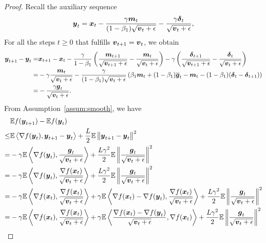 \begin{proof}
Recall the auxiliary sequence
\begin{align*}
    \boldsymbol{y}_t = \boldsymbol{x}_t - \frac{\gamma\boldsymbol{m}_t}{(1-\beta_1)\sqrt{\boldsymbol{v}_t+\epsilon}} - \frac{\gamma\boldsymbol{\delta}_{t}}{\sqrt{\boldsymbol{v}_t+\epsilon}},
\end{align*}
For all the steps $t\geq 0$ that fulfills $\boldsymbol{v}_{t+1}=\boldsymbol{v}_{t}$, we obtain
\begin{align*}
    \boldsymbol{y}_{t+1} - \boldsymbol{y}_{t} = & \boldsymbol{x}_{t+1} - \boldsymbol{x}_{t} - \frac{\gamma}{1- \beta_1} \left(\frac{\boldsymbol{m}_{t+1}}{\sqrt{\boldsymbol{v}_{t+1}+\epsilon}} - \frac{\boldsymbol{m}_{t}}{\sqrt{\boldsymbol{v}_{t}+\epsilon}} \right) - \gamma\left( \frac{\boldsymbol{\delta}_{t+1}}{\sqrt{\boldsymbol{v}_{t+1}+\epsilon}} - \frac{\boldsymbol{\delta}_{t}}{\sqrt{\boldsymbol{v}_{t}+\epsilon}}\right) \\
= & -\gamma\frac{\boldsymbol{m}_t}{\sqrt{\boldsymbol{v}_t + \epsilon}} - \frac{\gamma}{(1- \beta_1)\sqrt{\boldsymbol{v}_{t}+\epsilon}} \left(\beta_1\boldsymbol{m}_{t} + (1-\beta_1)\overline{\boldsymbol{g}}_{t} - \boldsymbol{m}_{t} - (1-\beta_1) (\boldsymbol{\delta}_{t} - \boldsymbol{\delta}_{t+1})\right) \\
    = & -\frac{\gamma \boldsymbol{g}_{t}}{\sqrt{\boldsymbol{v}_{t}+\epsilon}}.
\end{align*}
From Assumption~\ref{assum:smooth}, we have
\begin{align*}
    & \mathbb E f(\*{y}_{t+1}) - \mathbb Ef(\*{y}_{t}) \\
    \leq &\mathbb E\left\langle \nabla f(\*{y}_t), \*{y}_{t+1} - \*{y}_t \right\rangle + \frac{L}{2}\mathbb E\left\|\*{y}_{t+1} - \*{y}_t \right\|^2\\
=& -\gamma \mathbb E\left\langle \nabla f(\*{y}_t), \frac{\*{g}_{t}}{\sqrt{\*v_t+\epsilon}}\right\rangle + \frac{L\gamma^2}{2}\mathbb E\left\| \frac{\*{g}_{t}}{\sqrt{\*v_t+\epsilon}}\right\|^2\\
    =& -\gamma \mathbb E\left\langle \nabla f(\*{y}_t), \frac{\nabla f(\*x_t)}{\sqrt{\*v_t+\epsilon}}\right\rangle + \frac{L\gamma^2}{2}\mathbb E\left\| \frac{\*{g}_{t}}{\sqrt{\*v_t+\epsilon}}\right\|^2 \\
=& -\gamma \mathbb E\left\langle \nabla f(\*{x}_t), \frac{\nabla f(\*x_t)}{\sqrt{\*v_t+\epsilon}}\right\rangle + \gamma \mathbb E\left\langle \nabla f(\*{x}_t) - \nabla f(\*{y}_t), \frac{\nabla f(\*x_t)}{\sqrt{\*v_t+\epsilon}}\right\rangle + \frac{L\gamma^2}{2}\mathbb E\left\| \frac{\*{g}_{t}}{\sqrt{\*v_t+\epsilon}}\right\|^2 \\
    =& -\gamma \mathbb E\left\langle \nabla f(\*{x}_t), \frac{\nabla f(\*x_t)}{\sqrt{\*v_t+\epsilon}}\right\rangle + \gamma \mathbb E\left\langle \frac{\nabla f(\*{x}_t) - \nabla f(\*{y}_t)}{\sqrt{\*v_t+\epsilon}}, \nabla f(\*x_t)\right\rangle + \frac{L\gamma^2}{2}\mathbb E\left\| \frac{\*{g}_{t}}{\sqrt{\*v_t+\epsilon}}\right\|^2 \\

\end{align*}
\end{proof}
